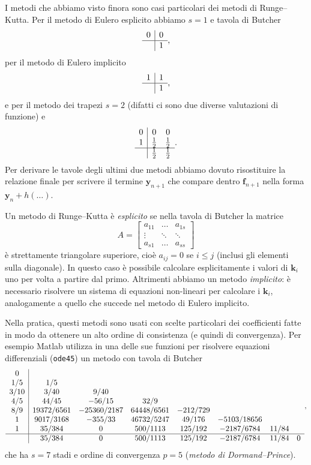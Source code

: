 \documentclass[a4paper]{report}
\theoremstyle{definiton}
\theoremstyle{remark}
\newcommand{\y}{\mathbf{y}}
\begin{document}
I metodi che abbiamo visto finora sono casi particolari dei metodi di Runge--Kutta. Per il metodo di Eulero esplicito abbiamo $s=1$ e tavola di Butcher
\[
\begin{array}{c|c}
0 & 0\\
\hline
 & 1
\end{array},
\]
per il metodo di Eulero implicito
\[
\begin{array}{c|c}
1 & 1\\
\hline
 & 1
\end{array},
\]
e per il metodo dei trapezi $s=2$ (difatti ci sono due diverse valutazioni di funzione) e 
\[
\begin{array}{c|cc}
0 & 0 & 0\\
1 & \frac12 & \frac12\\
\hline
& \frac12 & \frac12
\end{array}.
\]
Per derivare le tavole degli ultimi due metodi abbiamo dovuto risostituire la relazione finale per scrivere il termine $\y_{n+1}$ che compare dentro $\mathbf{f}_{n+1}$ nella forma $\y_n + h(\dots)$.

Un metodo di Runge--Kutta è \emph{esplicito} se nella tavola di Butcher la matrice
\[
    A = \begin{bmatrix}
        a_{11} & \dots & a_{1s}\\
        \vdots & \ddots & \ddots\\
        a_{s1} & \dots & a_{ss}
    \end{bmatrix}
\]
è strettamente triangolare superiore, cioè $a_{ij}=0$ se $i \leq j$ (inclusi gli elementi sulla diagonale). In questo caso è possibile calcolare esplicitamente i valori di $\mathbf{k}_i$ uno per volta a partire dal primo. Altrimenti abbiamo un metodo \emph{implicito}: è necessario risolvere un sistema di equazioni non-lineari per calcolare i $\mathbf{k}_i$, analogamente a quello che succede nel metodo di Eulero implicito.

Nella pratica, questi metodi sono usati con scelte particolari dei coefficienti fatte in modo da ottenere un alto ordine di consistenza (e quindi di convergenza). Per esempio Matlab utilizza in una delle sue funzioni per risolvere equazioni differenziali (\lstinline{ode45}) un metodo con tavola di Butcher
\[
\begin{array}{c|ccccccc}
    0\\
    1/5 &    1/5\\
    3/10 &   3/40 &   9/40\\
    4/5 &    44/45 &  -56/15 &  32/9\\
    8/9   &  19372/6561 & -25360/2187  &   64448/6561 & -212/729\\
    1 &  9017/3168  & -355/33   &  46732/5247 & 49/176 & -5103/18656\\
    1 &  35/384 & 0 &  500/1113  &  125/192   &  -2187/6784 & 11/84   \\
    \hline
    &  35/384 & 0 &  500/1113  &  125/192   &  -2187/6784 & 11/84 & 0  \\
\end{array},
\]
che ha $s=7$ stadi e ordine di convergenza $p=5$ (\emph{metodo di Dormand--Prince}).
\end{document}
